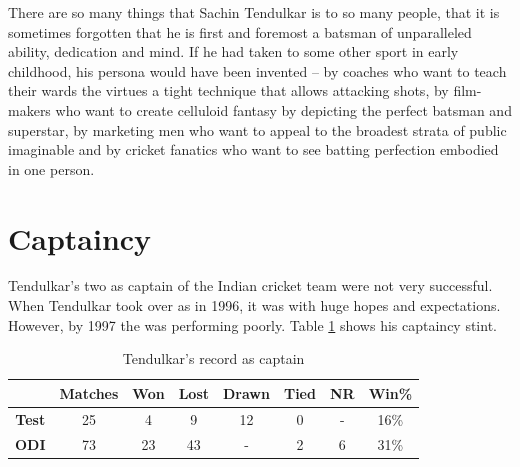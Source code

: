 \documentclass{article}
\begin{document}
There are so many things that Sachin Tendulkar is to so many people, that it is sometimes forgotten that he is first and foremost a batsman of unparalleled ability, dedication and mind. If he had taken to some other sport in early childhood, his persona would have been invented -- by coaches who want to teach their wards the virtues a tight technique that allows attacking shots, by film-makers who want to create celluloid fantasy by depicting the perfect batsman and superstar, by marketing men who want to appeal to the broadest strata of public imaginable and by cricket fanatics who want to see batting perfection embodied in one person. \cite{cric} \\ 

\section{Captaincy}
Tendulkar's two  as captain of the Indian cricket team were not very successful. When Tendulkar took over as  in 1996, it was with huge hopes and expectations. However, by 1997 the  was performing poorly.
Table \ref{table:cap} shows his captaincy stint.

\begin{table}[h1]
\begin{center}
\begin{tabular}{|c|c|c|c|c|c|c|c|}
\hline
& {\bf Matches} & {\bf Won} & {\bf Lost} & {\bf Drawn} & {\bf Tied} & {\bf NR} & {\bf Win\%} \\
\hline
{\bf Test} & 25 & 4 & 9 & 12 & 0 & - & 16\% \\
{\bf ODI} & 73 & 23 & 43 & - & 2 & 6 & 31\% \\
\hline
\end{tabular}
\caption{Tendulkar's record as captain \cite{wiki}}
\label{table:cap}
\end{center}
\end{table}
	
\end{document}
